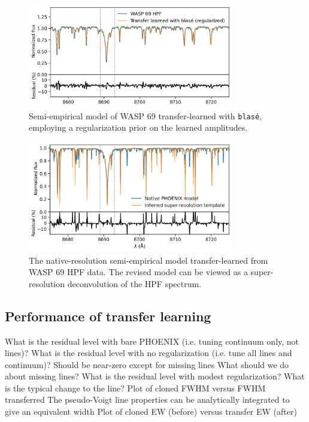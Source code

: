 \documentclass[modern]{aastex631}
\begin{document}
\begin{figure}[hbt!]
    \centering
    \includegraphics[width=0.8\textwidth]{figures/blase_WASP69_regularized.png}
    \caption{Semi-empirical model of WASP 69 transfer-learned with \texttt{blas\'e}, employing a regularization prior on the learned amplitudes.}
    \label{fig_WASP69_transferred}
\end{figure}

\begin{figure}[hbt!]
    \centering
    \includegraphics[width=0.8\textwidth]{figures/blase_super_resolution_template.png}
    \caption{The native-resolution semi-empirical model transfer-learned from WASP 69 HPF data. The revised model can be viewed as a super-resolution deconvolution of the HPF spectrum.}
    \label{fig_WASP69_regularized}
\end{figure}

\subsection{Performance of transfer learning}


\begin{outline}
    \1 What is the residual level with bare PHOENIX (i.e. tuning continuum only, not lines)?
    \1 What is the residual level with no regularization (i.e. tune all lines and continuum)?
    \2 Should be near-zero except for missing lines
    \2 What should we do about missing lines?
    \1 What is the residual level with modest regularization? What is the typical change to the line?
    \2 Plot of cloned FWHM versus FWHM transferred
    \2 The pseudo-Voigt line properties can be analytically integrated to give an equivalent width
    \2 Plot of cloned EW (before) versus transfer EW (after)
\end{outline}
\end{document}
